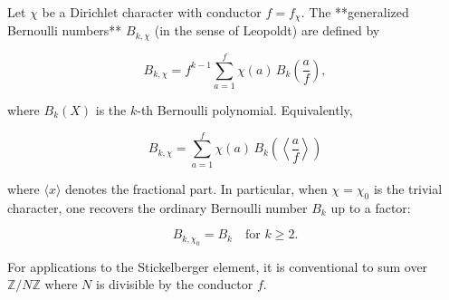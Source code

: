 Let $\chi$ be a Dirichlet character with conductor $f = f_\chi$. The **generalized Bernoulli numbers** $B_{k,\chi}$ (in the sense of Leopoldt) are defined by

$$
B_{k,\chi} = f^{k-1} \sum_{a=1}^{f} \chi(a) \, B_k\!\left(\frac{a}{f}\right),
$$

where $B_k(X)$ is the $k$-th Bernoulli polynomial. Equivalently,

$$
B_{k,\chi} = \sum_{a=1}^{f} \chi(a) \, B_{k}\!\left(\left\langle\frac{a}{f}\right\rangle\right)
$$

where $\langle x \rangle$ denotes the fractional part. In particular, when $\chi = \chi_0$ is the trivial character, one recovers the ordinary Bernoulli number $B_k$ up to a factor:

$$
B_{k,\chi_0} = B_k \quad \text{for } k \geq 2.
$$

For applications to the Stickelberger element, it is conventional to sum over $\mathbb{Z}/N\mathbb{Z}$ where $N$ is divisible by the conductor $f$.
